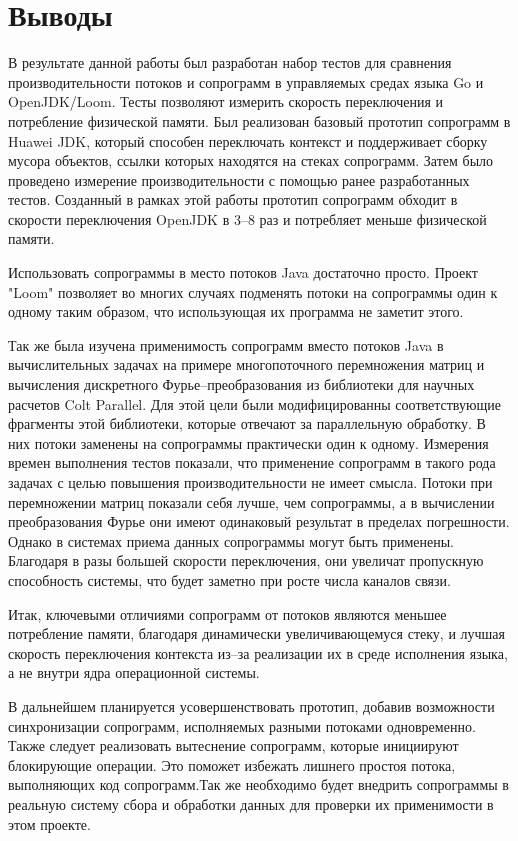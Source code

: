 \section{Выводы}
	В результате данной работы был разработан набор тестов для сравнения производительности потоков и сопрограмм в
	управляемых средах языка Go и OpenJDK/Loom. Тесты позволяют измерить скорость переключения и
	потребление физической памяти. Был реализован базовый прототип сопрограмм в
	Huawei JDK, который способен переключать контекст и поддерживает сборку мусора объектов, ссылки которых находятся
	на стеках сопрограмм. Затем было проведено измерение производительности с помощью ранее разработанных тестов.
	Созданный в рамках этой работы прототип сопрограмм обходит в скорости переключения
	OpenJDK в 3--8 раз и потребляет меньше физической памяти.
	\par
	Использовать сопрограммы в место потоков Java достаточно просто. Проект "Loom"
	позволяет во многих случаях подменять потоки на сопрограммы один к одному таким образом,
	что использующая их программа не заметит этого.
	\par
	Так же была изучена применимость сопрограмм вместо потоков Java в вычислительных задачах на
	примере многопоточного перемножения матриц и вычисления дискретного Фурье--преобразования 
	из библиотеки для научных расчетов Colt Parallel. Для этой цели были модифицированны соответствующие 
	фрагменты этой библиотеки, которые отвечают за параллельную обработку. В них потоки заменены 
	на сопрограммы практически один к одному.
	Измерения времен выполнения тестов показали, что применение сопрограмм в такого рода задачах с целью
	повышения производительности не имеет смысла. Потоки при перемножении матриц показали себя лучше,
	чем сопрограммы, а в вычислении преобразования Фурье они имеют одинаковый результат в пределах погрешности.
	Однако в системах приема данных сопрограммы могут быть применены. Благодаря в разы большей скорости
	переключения, они увеличат пропускную способность системы, что будет заметно при росте числа каналов связи.
	\par
	Итак, ключевыми отличиями сопрограмм от потоков являются меньшее потребление памяти, благодаря
	динамически увеличивающемуся стеку, и лучшая скорость переключения контекста из--за реализации 
	их в среде исполнения языка, а не внутри ядра операционной системы.
	\par
	В дальнейшем планируется усовершенствовать прототип, добавив возможности синхронизации
	сопрограмм, исполняемых разными потоками одновременно. Также следует реализовать вытеснение сопрограмм, которые
	инициируют блокирующие операции. Это поможет избежать лишнего простоя потока, выполняющих код сопрограмм.Так же
	необходимо будет внедрить сопрограммы в реальную систему сбора и обработки данных для проверки их 
	применимости в этом проекте.
\clearpage
